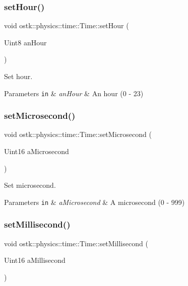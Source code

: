 \subsubsection{\texorpdfstring{set\+Hour()}{setHour()}}
{\footnotesize\ttfamily void ostk\+::physics\+::time\+::\+Time\+::set\+Hour (\begin{DoxyParamCaption}\item[{Uint8}]{an\+Hour }\end{DoxyParamCaption})}



Set hour. 


\begin{DoxyParams}[1]{Parameters}
\mbox{\tt in}  & {\em an\+Hour} & An hour (0 -\/ 23) \\
\hline
\end{DoxyParams}
\mbox{\label{classostk_1_1physics_1_1time_1_1_time_a4e746282febe29d5412f7e871b49ac86}} 
\subsubsection{\texorpdfstring{set\+Microsecond()}{setMicrosecond()}}
{\footnotesize\ttfamily void ostk\+::physics\+::time\+::\+Time\+::set\+Microsecond (\begin{DoxyParamCaption}\item[{Uint16}]{a\+Microsecond }\end{DoxyParamCaption})}



Set microsecond. 


\begin{DoxyParams}[1]{Parameters}
\mbox{\tt in}  & {\em a\+Microsecond} & A microsecond (0 -\/ 999) \\
\hline
\end{DoxyParams}
\mbox{\label{classostk_1_1physics_1_1time_1_1_time_a78a51113cfca7af8e14fbf519b04ad25}} 
\subsubsection{\texorpdfstring{set\+Millisecond()}{setMillisecond()}}
{\footnotesize\ttfamily void ostk\+::physics\+::time\+::\+Time\+::set\+Millisecond (\begin{DoxyParamCaption}\item[{Uint16}]{a\+Millisecond }\end{DoxyParamCaption})}



